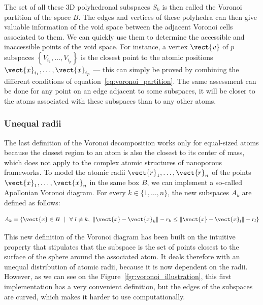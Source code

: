 \documentclass[main]{subfiles}
\begin{document}
The set of all these 3D polyhedronal subspaces $S_{k}$ is then called the Voronoi partition of the space $B$. The edges and vertices of these polyhedra can then give valuable information of the void space between the adjacent Voronoi cells associated to them. We can quickly use them to determine the accessible and inaccessible points of the void space. For instance, a vertex $\vect{v}$ of $p$ subspaces $\left\{V_{i_1},\ldots,V_{i_p}\right\}$ is the closest point to the atomic positions $\vect{x}_{i_1},\ldots,\vect{x}_{i_p}$ --- this can simply be proved by combining the different conditions of equation~\ref{eq:voronoi_partition}. The same assessment can be done for any point on an edge adjacent to some subspaces, it will be closer to the atoms associated with these subspaces than to any other atoms.


\subsubsection{Unequal radii}

The last definition of the Voronoi decomposition works only for equal-sized atoms because the closest region to an atom is also the closest to its center of mass, which does not apply to the complex atomic structures of nanoporous frameworks. To model the atomic radii $\vect{r}_1,\ldots,\vect{r}_n$ of the points $\vect{x}_1,\ldots,\vect{x}_n$ in the same box $B$, we can implement a so-called Apollonian Voronoi diagram.\cite{voronoi_apollonian} For every $k\in\{1,\ldots,n\}$, the new subspaces $A_{k}$ are defined as follows:

\begin{equation}\label{eq:r_voronoi_apollonian}
  A_{k} = \left\{\vect{x} \in B\ \ |\ \ \forall\ l\neq k,\ \lVert \vect{x}-\vect{x}_k \rVert - r_k \leq \lVert \vect{x}-\vect{x}_l \rVert - r_l \right\}
\end{equation}

This new definition of the Voronoi diagram has been built on the intuitive property that stipulates that the subspace is the set of points closest to the surface of the sphere around the associated atom. It deals therefore with an unequal distribution of atomic radii, because it is now dependent on the radii. However, as we can see on the Figure~\ref{fgr:voronoi_illustration}, this first implementation has a very convenient definition, but the edges of the subspaces are curved, which makes it harder to use computationally. 
\end{document}
